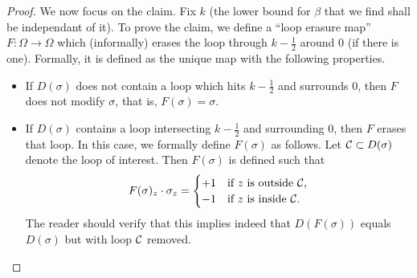 \begin{proof}
    We now focus on the claim.
    Fix $k$ (the lower bound for $\beta$ that we find shall be independant
    of it).
    To prove the claim,
    we define a ``loop erasure map'' $F:\Omega\to\Omega$
    which (informally) erases the loop through $k-\frac12$
    around $0$
    (if there is one).
    Formally, it is defined as the unique map with the following properties.
    \begin{itemize}
        \item If $D(\sigma)$ does not contain a loop which hits $k-\frac12$
        and surrounds $0$,
        then $F$ does not modify $\sigma$,
        that is, $F(\sigma)=\sigma$.
        \item If $D(\sigma)$ contains a loop intersecting $k-\frac12$
        and surrounding $0$,
        then $F$ erases that loop.
        In this case, we formally define $F(\sigma)$ as follows.
        Let $\mathcal C\subset D(\sigma)$ denote the loop of interest.
        Then $F(\sigma)$ is defined such that
        \[
            F(\sigma)_z \cdot \sigma_z = \begin{cases}
                +1 &\text{if $z$ is outside $\calC$,}\\
                -1 &\text{if $z$ is inside $\calC$.}
            \end{cases}
        \]
        The reader should verify that this implies indeed
        that $D(F(\sigma))$ equals $D(\sigma)$
        but with loop $\mathcal C$ removed.
    \end{itemize}


\end{proof}
